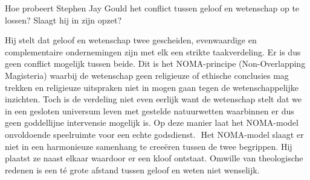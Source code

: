 \documentclass[main.tex]{subfiles}
\begin{document}
\begin{examenvraag}
    \begin{vraag}
        Hoe probeert Stephen Jay Gould het conflict tussen geloof en wetenschap op te lossen? Slaagt hij in zijn opzet?
    \end{vraag}

    \begin{antwoord}
	Hij stelt dat geloof en wetenschap twee gescheiden,‭ ‬evenwaardige en 		
	complementaire ondernemingen zijn met elk een strikte taakverdeling.‭ ‬Er 
	is dus geen conflict mogelijk tussen beide.‭ ‬Dit is het NOMA-principe‭ 
	(‬Non-Overlapping Magisteria‭) ‬waarbij de wetenschap geen religieuze of 
	ethische conclusies mag trekken en religieuze uitspraken niet in mogen 
	gaan tegen de wetenschappelijke inzichten.‭ ‬Toch is de verdeling niet even 
	eerlijk want de wetenschap stelt dat we in een gesloten universum leven 
	met gestelde natuurwetten waarbinnen er dus geen goddellijne intervensie 
	mogelijk is.‭ ‬Op deze manier laat het NOMA-model onvoldoende speelruimte 
	voor een echte godsdienst.‭ ‬‭ ‬Het 
	NOMA-model slaagt er niet in een harmonieuze samenhang te creeëren tussen 
	de 
	twee begrippen.‭ ‬Hij plaatst ze naast elkaar waardoor er een kloof 
	ontstaat.‭ ‬Omwille van theologische redenen is een té grote afstand tussen 
	geloof en weten‭ ‬niet wenselijk.
    \end{antwoord}
\end{examenvraag}
\end{document}
